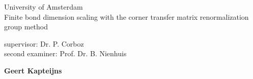 \newlength\drop
\newcommand*{\titleMS}{
\thispagestyle{empty}
\begingroup%
\drop=0.1\textheight
\vspace*{\drop}
\centering
{\LARGE University of Amsterdam}\\[2\baselineskip]
{\LARGE Finite bond dimension scaling with the corner transfer matrix renormalization group method}\par
\vspace{\drop}
{\large supervisor: Dr. P. Corboz\\
second examiner: Prof. Dr. B. Nienhuis}\par
\vfill
{\large\bfseries Geert Kapteijns}\par
\clearpage
\endgroup}

\titleMS
